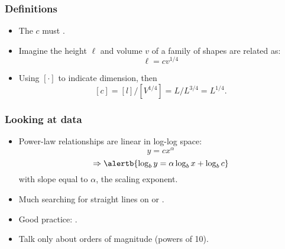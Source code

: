 \begin{frame}
  \frametitle{Definitions}

  \begin{block}{}
    \begin{itemize}
    \item<1->
      The  $c$ must .
    \item<2->
      Imagine the height $\ell$ and volume $v$ of 
      a family of shapes
      are related as:
      $$\ell = c v^{1/4}$$
    \item<3->
      Using $[ \cdot ]$ to indicate dimension, then 
      $$[c] = [l]/[V^{1/4}] = L/L^{3/4} = L^{1/4}.$$
    \end{itemize}
  \end{block}

\end{frame}



\begin{frame}
  \frametitle{Looking at data}

  \begin{block}{}
    \begin{itemize}
    \item<1->
      Power-law relationships
      are linear in log-log space:
      $$y = c x^\alpha $$
      $$ \Rightarrow \alertb{\log_{b} y = \alpha \log_{b} x + \log_{b} c} $$
      with slope equal to $\alpha$, the scaling exponent.
    \item<2-> 
      Much searching for straight lines on 
       or .
    \item<3-> 
      Good practice: .
    \item<4-> 
      Talk only about orders of magnitude (powers of 10).
    \end{itemize}
  \end{block}

\end{frame}

